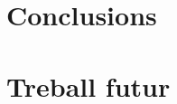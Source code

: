 \documentclass{tfgitic}[2024/07/01]
\begin{document}
{\chapter{Conclusions}

\chapter{Treball futur}

}
\end{document}
